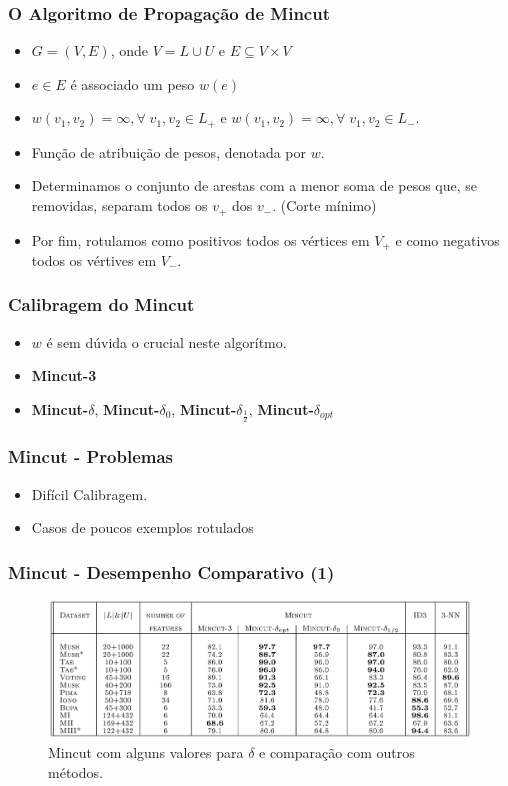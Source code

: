 \documentclass{beamer}
\begin{document}
      \frame
      {
        \frametitle{O Algoritmo de Propagação de Mincut}
        \begin{itemize}
          \item $G = (V,E)$, onde $V = L \cup U$ e $E \subseteq V \times V$
          \item $e \in E$ é associado um peso $w(e)$
          \item $w(v_1,v_2) = \infty, \forall \; v_1,v_2 \in L_+$ e $w(v_1,v_2) = \infty, \forall \; v_1,v_2 \in L_-$.
          \item Função de atribuição de pesos, denotada por $w$.
          \item Determinamos o conjunto de arestas com a menor soma de pesos que, se removidas, separam todos os $v_+$ dos $v_-$. (Corte mínimo)
          \item Por fim, rotulamos como positivos todos os vértices em $V_+$ e como negativos todos os vértives em $V_-$.
        \end{itemize}
      }

      \frame
      {
        \frametitle{Calibragem do Mincut}
        \begin{itemize}
          \item $w$ é sem dúvida o crucial neste algorítmo.
          \item {\bf Mincut-3}
          \item {\bf Mincut-$\delta$}, {\bf Mincut-$\delta_0$}, {\bf Mincut-$\delta_\frac{1}{2}$}, {\bf Mincut-$\delta_{opt}$}
        \end{itemize}
      }

      \frame
      {
        \frametitle{Mincut - Problemas}
        \begin{itemize}
          \item Difícil Calibragem.
          \item Casos de poucos exemplos rotulados
        \end{itemize}
      }

    \frame
    {
      \frametitle{Mincut - Desempenho Comparativo (1)}
      \begin{figure}[!h]
        \begin{center}
                \includegraphics[width=1\textwidth]{mincut-comp}
        \end{center}
        \caption{Mincut com alguns valores para $\delta$ e comparação com outros métodos.}
      \end{figure}
    }
\end{document}
